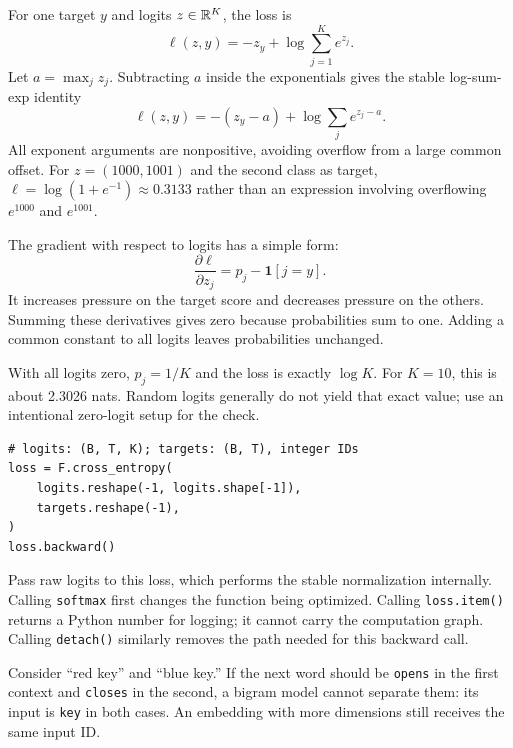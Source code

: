 For one target $y$ and logits $z\in\mathbb{R}^K$, the loss is
\[
 \ell(z,y)=-z_y+\log\sum_{j=1}^{K}e^{z_j}.
\]
Let $a=\max_jz_j$. Subtracting $a$ inside the exponentials gives the stable
log-sum-exp identity
\[
 \ell(z,y)=-(z_y-a)+\log\sum_j e^{z_j-a}.
\]
All exponent arguments are nonpositive, avoiding overflow from a large
common offset. For $z=(1000,1001)$ and the second class as target,
$\ell=\log(1+e^{-1})\approx0.3133$ rather than an expression involving
overflowing $e^{1000}$ and $e^{1001}$.


The gradient with respect to logits has a simple form:
\[
 \frac{\partial\ell}{\partial z_j}=p_j-\mathbf1[j=y].
\]
It increases pressure on the target score and decreases pressure on the
others. Summing these derivatives gives zero because probabilities sum to
one. Adding a common constant to all logits leaves probabilities unchanged.

With all logits zero, $p_j=1/K$ and the loss is exactly $\log K$.
For $K=10$, this is about 2.3026 nats. Random logits generally do not yield
that exact value; use an intentional zero-logit setup for the check.

\begin{lstlisting}
# logits: (B, T, K); targets: (B, T), integer IDs
loss = F.cross_entropy(
    logits.reshape(-1, logits.shape[-1]),
    targets.reshape(-1),
)
loss.backward()
\end{lstlisting}
Pass raw logits to this loss, which performs the stable normalization
internally. Calling \texttt{softmax} first changes the function being
optimized. Calling \texttt{loss.item()} returns a Python number for
logging; it cannot carry the computation graph. Calling \texttt{detach()}
similarly removes the path needed for this backward call.


Consider ``red key'' and ``blue key.'' If the next word should be
\texttt{opens} in the first context and \texttt{closes} in the second,
a bigram model cannot separate them: its input is \texttt{key} in both cases.
An embedding with more dimensions still receives the same input ID.

